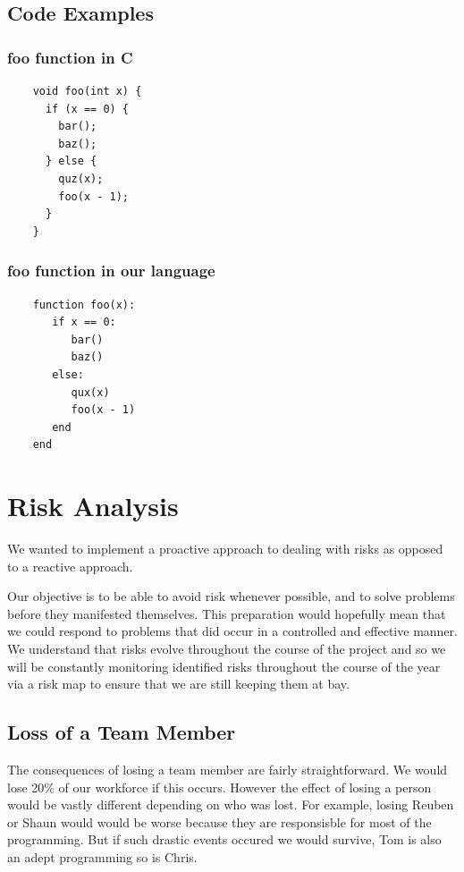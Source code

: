 \documentclass[a4paper,12pt]{article}
\begin{document}
\subsection*{Code Examples}
\begin{multicols}{2}
  \subsubsection*{foo function in C}
  \begin{lstlisting}
    void foo(int x) {
      if (x == 0) {
        bar();
        baz();
      } else {
        quz(x);
        foo(x - 1);
      }
    }
  \end{lstlisting}
  \subsubsection*{foo function in our language}
  \begin{lstlisting}
    function foo(x):
       if x == 0:
          bar()
          baz()
       else:
          qux(x)
          foo(x - 1)
       end
    end
  \end{lstlisting}
\end{multicols}

\pagebreak
\section*{Risk Analysis}

We wanted to implement a proactive approach to dealing with risks as opposed to a reactive approach.

Our objective is to be able to avoid risk whenever possible, and to solve problems before they manifested themselves. This preparation would hopefully mean that we could respond to problems that did occur in a controlled and effective manner. We understand that risks evolve throughout the course of the project and so we will be constantly monitoring identified risks throughout the course of the year via a risk map to ensure that we are still keeping them at bay. 

\subsection*{Loss of a Team Member}
The consequences of losing a team member are fairly straightforward. We would lose 20\% of our workforce if this occurs. However the effect of losing a person would be vastly different depending on who was lost. For example, losing Reuben or Shaun would would be worse because they are responsisble for most of the programming. But if such drastic events occured we would survive, Tom is also an adept programming so is Chris.
\end{document}
